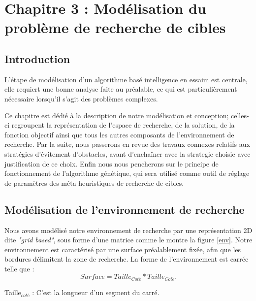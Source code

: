 
\chapter{Chapitre 3 : Modélisation du problème de recherche de cibles} %

\label{Chapter3} %
\section{Introduction}
L'étape de modélisation d'un algorithme basé intelligence en essaim est centrale, elle requiert une bonne analyse faite au préalable, ce qui est particulièrement nécessaire lorsqu’il s'agit des problèmes complexes.

Ce chapitre est dédié à la description de notre modélisation et conception; celles-ci regroupent la représentation de l'espace de recherche, de la solution, de la fonction objectif ainsi que tous les autres composants de l'environnement de recherche. 
Par la suite, nous passerons en revue des travaux connexes relatifs aux stratégies d’évitement d’obstacles, avant d’enchaîner avec la strategie choisie avec justification de ce choix. Enfin nous nous pencherons sur le principe de fonctionnement de l'algorithme génétique, qui sera utilisé comme outil de réglage de paramètres des méta-heuristiques de recherche de cibles.


\section{Modélisation de l'environnement de recherche}
\label{vuEnv}
Nous avons modélisé notre environnement de recherche par une représentation 2D dite \textit{"grid based"}, sous forme d’une matrice comme le montre la figure \ref{env}. Notre environnement est caractérisé par une surface préalablement fixée, afin que les bordures délimitent la zone de recherche. La forme de l’environnement est carrée telle que :
\begin{equation}
Surface = Taille_{Cot\acute{e}} * Taille_{Cot\acute{e}}.
\end{equation}

Taille$_{cot\text{é}}$ : C'est la longueur d'un segment du carré.

